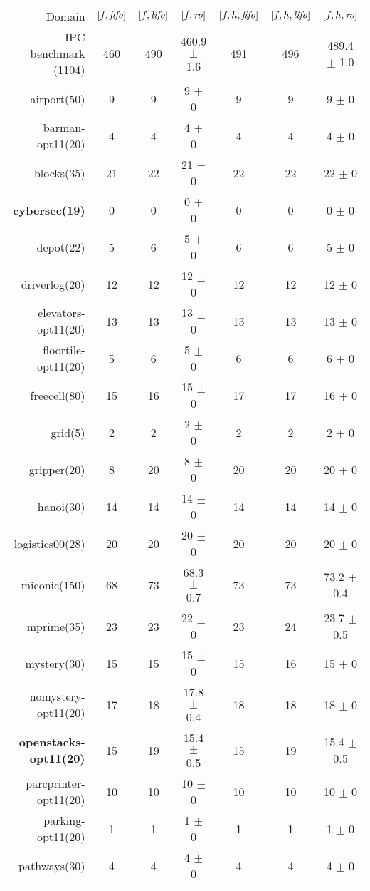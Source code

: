 \begin{center}
\begin{tabular}{|r|*{2}{ccc|}}
Domain & \([f,{\text{\textit{fifo}}}]\) & \([f,{\text{\textit{lifo}}}]\) & \([f,{\text{\textit{ro}}}]\) & \([f,h,{\text{\textit{fifo}}}]\) & \([f,h,{\text{\textit{lifo}}}]\) & \([f,h,{\text{\textit{ro}}}]\)\\
IPC benchmark (1104) & 460 & 490 & 460.9 \(\pm\) 1.6 & 491 & 496 & 489.4 \(\pm\) 1.0\\
airport(50) & 9 & 9 & 9 \(\pm\) 0 & 9 & 9 & 9 \(\pm\) 0\\
barman-opt11(20) & 4 & 4 & 4 \(\pm\) 0 & 4 & 4 & 4 \(\pm\) 0\\
blocks(35) & 21 & 22 & 21 \(\pm\) 0 & 22 & 22 & 22 \(\pm\) 0\\
\textbf{cybersec(19)} & 0 & 0 & 0 \(\pm\) 0 & 0 & 0 & 0 \(\pm\) 0\\
depot(22) & 5 & 6 & 5 \(\pm\) 0 & 6 & 6 & 5 \(\pm\) 0\\
driverlog(20) & 12 & 12 & 12 \(\pm\) 0 & 12 & 12 & 12 \(\pm\) 0\\
elevators-opt11(20) & 13 & 13 & 13 \(\pm\) 0 & 13 & 13 & 13 \(\pm\) 0\\
floortile-opt11(20) & 5 & 6 & 5 \(\pm\) 0 & 6 & 6 & 6 \(\pm\) 0\\
freecell(80) & 15 & 16 & 15 \(\pm\) 0 & 17 & 17 & 16 \(\pm\) 0\\
grid(5) & 2 & 2 & 2 \(\pm\) 0 & 2 & 2 & 2 \(\pm\) 0\\
gripper(20) & 8 & 20 & 8 \(\pm\) 0 & 20 & 20 & 20 \(\pm\) 0\\
hanoi(30) & 14 & 14 & 14 \(\pm\) 0 & 14 & 14 & 14 \(\pm\) 0\\
logistics00(28) & 20 & 20 & 20 \(\pm\) 0 & 20 & 20 & 20 \(\pm\) 0\\
miconic(150) & 68 & 73 & 68.3 \(\pm\) 0.7 & 73 & 73 & 73.2 \(\pm\) 0.4\\
mprime(35) & 23 & 23 & 22 \(\pm\) 0 & 23 & 24 & 23.7 \(\pm\) 0.5\\
mystery(30) & 15 & 15 & 15 \(\pm\) 0 & 15 & 16 & 15 \(\pm\) 0\\
nomystery-opt11(20) & 17 & 18 & 17.8 \(\pm\) 0.4 & 18 & 18 & 18 \(\pm\) 0\\
\textbf{openstacks-opt11(20)} & 15 & 19 & 15.4 \(\pm\) 0.5 & 15 & 19 & 15.4 \(\pm\) 0.5\\
parcprinter-opt11(20) & 10 & 10 & 10 \(\pm\) 0 & 10 & 10 & 10 \(\pm\) 0\\
parking-opt11(20) & 1 & 1 & 1 \(\pm\) 0 & 1 & 1 & 1 \(\pm\) 0\\
pathways(30) & 4 & 4 & 4 \(\pm\) 0 & 4 & 4 & 4 \(\pm\) 0\\

\end{tabular}
\end{center}
